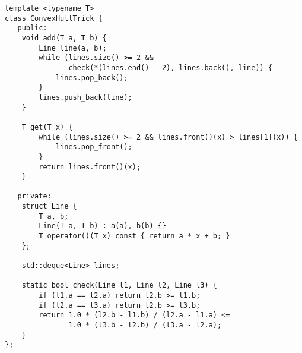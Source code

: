 \begin{lstlisting}
template <typename T>
class ConvexHullTrick {
   public:
    void add(T a, T b) {
        Line line(a, b);
        while (lines.size() >= 2 &&
               check(*(lines.end() - 2), lines.back(), line)) {
            lines.pop_back();
        }
        lines.push_back(line);
    }

    T get(T x) {
        while (lines.size() >= 2 && lines.front()(x) > lines[1](x)) {
            lines.pop_front();
        }
        return lines.front()(x);
    }

   private:
    struct Line {
        T a, b;
        Line(T a, T b) : a(a), b(b) {}
        T operator()(T x) const { return a * x + b; }
    };

    std::deque<Line> lines;

    static bool check(Line l1, Line l2, Line l3) {
        if (l1.a == l2.a) return l2.b >= l1.b;
        if (l2.a == l3.a) return l2.b >= l3.b;
        return 1.0 * (l2.b - l1.b) / (l2.a - l1.a) <=
               1.0 * (l3.b - l2.b) / (l3.a - l2.a);
    }
};
\end{lstlisting}